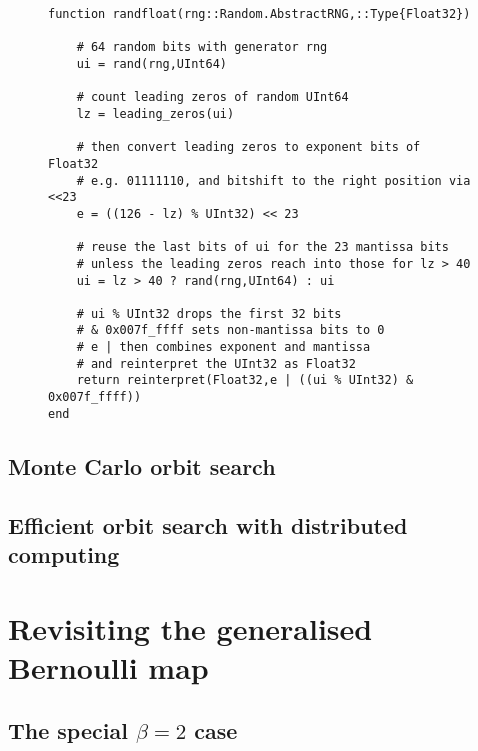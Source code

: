 \begin{figure}[tbhp]
\begin{lstlisting}[language=JuliaLocal,label=lst:randfloat,caption={\textbf{An improved random number generator (RNG) for uniformly
distributed floats.} The Julia function \texttt{randfloat} takes \texttt{rng} as an argument for an RNG for 64-bit unsigned integers \texttt{UInt64}.
\texttt{\%} is the remainder after division, for unsigned integers effectively converting between unsigned integers by adding leading
zeros or discarding leading bits. \texttt{?} indicates a one-line if-clause. \texttt{\&} is the bitwise logical and-operation. \texttt{$\vert$}
is the bitwise logical or-operation.}]
function randfloat(rng::Random.AbstractRNG,::Type{Float32})

    # 64 random bits with generator rng
    ui = rand(rng,UInt64)

    # count leading zeros of random UInt64
    lz = leading_zeros(ui)

    # then convert leading zeros to exponent bits of Float32
    # e.g. 01111110, and bitshift to the right position via <<23
    e = ((126 - lz) % UInt32) << 23

    # reuse the last bits of ui for the 23 mantissa bits
    # unless the leading zeros reach into those for lz > 40
    ui = lz > 40 ? rand(rng,UInt64) : ui

    # ui % UInt32 drops the first 32 bits
    # & 0x007f_ffff sets non-mantissa bits to 0
    # e | then combines exponent and mantissa
    # and reinterpret the UInt32 as Float32
    return reinterpret(Float32,e | ((ui % UInt32) & 0x007f_ffff))
end
\end{lstlisting}
\end{figure}

\subsection{Monte Carlo orbit search}



\subsection{Efficient orbit search with distributed computing}

\section{Revisiting the generalised Bernoulli map}
\subsection{The special $\beta = 2$ case}
